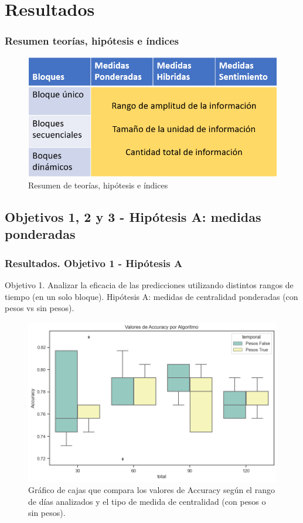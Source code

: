 \documentclass{beamer}
\begin{document}
\section{Resultados}

\begin{frame}
	\frametitle{Resumen teorías, hipótesis e índices}
	
	\begin{figure}[H]
		\centering
		\includegraphics[width=0.9\linewidth]{figs/imagen23}
		\caption{Resumen de teorías, hipótesis e índices}
		\label{fig:imagen23}
	\end{figure}
\end{frame}

\subsection{Objetivos 1, 2 y 3 - Hipótesis A: medidas ponderadas}
\begin{frame}
	\frametitle{Resultados. Objetivo 1 - Hipótesis A}
	\begin{block}{Objetivo 1. Analizar la eficacia de las predicciones utilizando distintos rangos de tiempo (en un solo bloque).}
		Hipótesis A: medidas de centralidad ponderadas (con pesos vs sin pesos).
	\end{block}
	
\begin{figure}[H]
	\centering
	\includegraphics[width=0.7\linewidth]{figs/cap6/figura_12}
	\caption{Gráfico de cajas que compara los valores de Accuracy según el rango de días analizados y el tipo de medida de centralidad (con pesos o sin pesos).}
	\label{fig:figura12}
\end{figure}
	
\end{frame}
\end{document}
